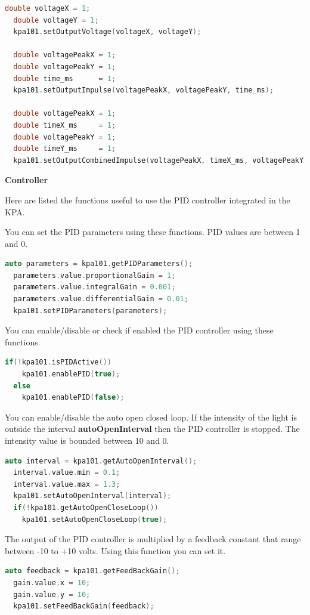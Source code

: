 \begin{lstlisting}[language=c++, gobble=2]
  double voltageX = 1;
  double voltageY = 1;
  kpa101.setOutputVoltage(voltageX, voltageY);

  double voltagePeakX = 1;
  double voltagePeakY = 1;
  double time_ms      = 1;
  kpa101.setOutputImpulse(voltagePeakX, voltagePeakY, time_ms);

  double voltagePeakX = 1;
  double timeX_ms     = 1;
  double voltagePeakY = 1;
  double timeY_ms     = 1;
  kpa101.setOutputCombinedImpulse(voltagePeakX, timeX_ms, voltagePeakY, timeY_ms);
\end{lstlisting}

\textbf{Controller}

Here are listed the functions useful to use the PID controller
integrated in the KPA.

You can set the PID parameters using these functions. PID values are
between 1 and 0.

\begin{lstlisting}[language=c++, gobble=2]
  auto parameters = kpa101.getPIDParameters();
  parameters.value.proportionalGain = 1;
  parameters.value.integralGain = 0.001;
  parameters.value.differentialGain = 0.01;
  kpa101.setPIDParameters(parameters);
\end{lstlisting}

You can enable/disable or check if enabled the PID controller using
these functions.

\begin{lstlisting}[language=c++, gobble=2]
  if(!kpa101.isPIDActive())
    kpa101.enablePID(true);
  else
    kpa101.enablePID(false);
\end{lstlisting}

You can enable/disable the auto open closed loop. If the intensity of
the light is outside the interval \textbf{autoOpenInterval} then the PID
controller is stopped. The intensity value is bounded between 10 and 0.

\begin{lstlisting}[language=c++, gobble=2]
  auto interval = kpa101.getAutoOpenInterval();
  interval.value.min = 0.1;
  interval.value.max = 1.3;
  kpa101.setAutoOpenInterval(interval);
  if(!kpa101.getAutoOpenCloseLoop())
    kpa101.setAutoOpenCloseLoop(true);
\end{lstlisting}

The output of the PID controller is multiplied by a feedback constant
that range between -10 to +10 volts. Using this function you can set
it.

\begin{lstlisting}[language=c++, gobble=2]
  auto feedback = kpa101.getFeedBackGain();
  gain.value.x = 10;
  gain.value.y = 10;
  kpa101.setFeedBackGain(feedback);
\end{lstlisting}


